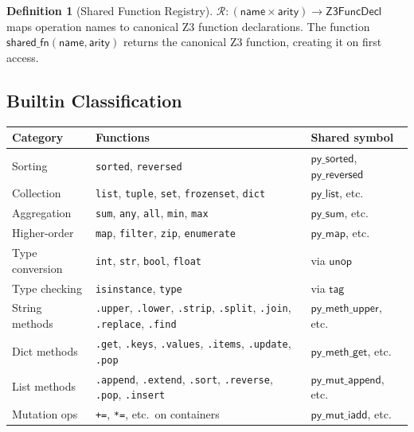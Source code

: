 \documentclass[11pt,a4paper]{report}
\theoremstyle{definition}
\newtheorem{definition}{Definition}[chapter]
\theoremstyle{plain}
\begin{document}
\begin{definition}[Shared Function Registry]
$\mathcal{R} : (\mathsf{name} \times \mathsf{arity}) \to
\mathsf{Z3FuncDecl}$ maps operation names to canonical Z3 function
declarations.  The function $\mathsf{shared\_fn}(\mathsf{name},
\mathsf{arity})$ returns the canonical Z3 function, creating it on
first access.
\end{definition}

\subsection{Builtin Classification}

\begin{center}
\small
\begin{tabular}{l l l}
  \textbf{Category} & \textbf{Functions} & \textbf{Shared symbol} \\
  \hline
  Sorting & \texttt{sorted}, \texttt{reversed} &
    $\mathsf{py\_sorted}$, $\mathsf{py\_reversed}$ \\
  Collection & \texttt{list}, \texttt{tuple}, \texttt{set},
    \texttt{frozenset}, \texttt{dict} &
    $\mathsf{py\_list}$, etc. \\
  Aggregation & \texttt{sum}, \texttt{any}, \texttt{all},
    \texttt{min}, \texttt{max} &
    $\mathsf{py\_sum}$, etc. \\
  Higher-order & \texttt{map}, \texttt{filter}, \texttt{zip},
    \texttt{enumerate} &
    $\mathsf{py\_map}$, etc. \\
  Type conversion & \texttt{int}, \texttt{str}, \texttt{bool},
    \texttt{float} &
    via $\mathsf{unop}$ \\
  Type checking & \texttt{isinstance}, \texttt{type} &
    via $\mathsf{tag}$ \\
  String methods & \texttt{.upper}, \texttt{.lower},
    \texttt{.strip}, \texttt{.split}, \texttt{.join},
    \texttt{.replace}, \texttt{.find} &
    $\mathsf{py\_meth\_upper}$, etc. \\
  Dict methods & \texttt{.get}, \texttt{.keys}, \texttt{.values},
    \texttt{.items}, \texttt{.update}, \texttt{.pop} &
    $\mathsf{py\_meth\_get}$, etc. \\
  List methods & \texttt{.append}, \texttt{.extend}, \texttt{.sort},
    \texttt{.reverse}, \texttt{.pop}, \texttt{.insert} &
    $\mathsf{py\_mut\_append}$, etc. \\
  Mutation ops & \texttt{+=}, \texttt{*=}, etc.\ on containers &
    $\mathsf{py\_mut\_iadd}$, etc. \\
\end{tabular}
\end{center}
\end{document}

